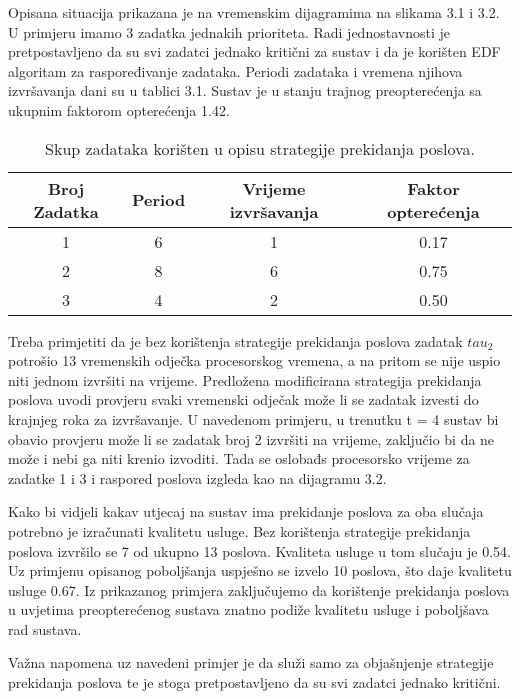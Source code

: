\documentclass[../zavrsni.tex]{subfiles}
\begin{document}
Opisana situacija prikazana je na vremenskim dijagramima na slikama 3.1 i 3.2. U primjeru imamo 3 zadatka jednakih prioriteta. Radi jednostavnosti
je pretpostavljeno da su svi zadatci jednako kritični za sustav i da je korišten EDF algoritam za raspoređivanje zadataka. 
Periodi zadataka i vremena njihova izvršavanja dani su u tablici 3.1. Sustav je u stanju trajnog preopterećenja sa ukupnim
faktorom opterećenja 1.42.

\begin{table}
\begin{center}
  \begin{tabular}{||c || c c c||} 
   \hline
   Broj Zadatka & Period & Vrijeme izvršavanja & Faktor opterećenja \\ [0.5ex] 
   \hline\hline
   1 & 6 & 1 & 0.17 \\ 
   \hline
   2 & 8 & 6 & 0.75 \\
   \hline
   3 & 4 & 2 & 0.50 \\
   \hline
  \end{tabular}
\end{center}
\caption{\label{tab:table-name}Skup zadataka korišten u opisu strategije prekidanja poslova.}
\end{table}

Treba primjetiti da je bez korištenja strategije prekidanja poslova zadatak $tau_2$ potrošio 13 vremenskih odječka procesorskog vremena, a 
na pritom se nije uspio niti jednom izvršiti na vrijeme.
Predložena modificirana strategija prekidanja poslova uvodi provjeru svaki vremenski odječak može li se zadatak izvesti do  krajnjeg roka 
za izvršavanje. 
U navedenom primjeru, u 
trenutku t = 4 sustav bi obavio provjeru može li se zadatak broj 2 izvršiti na vrijeme, zaključio bi da ne može i nebi ga niti krenio 
izvoditi. Tada se oslobađs procesorsko vrijeme za zadatke 1 i 3 i
raspored poslova izgleda kao na dijagramu 3.2. 

Kako bi vidjeli kakav utjecaj na sustav ima prekidanje poslova za oba slučaja potrebno je izračunati kvalitetu usluge.
Bez korištenja strategije prekidanja poslova
izvršilo se 7 od ukupno 13 poslova. Kvaliteta usluge u tom slučaju je 0.54. Uz primjenu opisanog poboljšanja uspješno se izvelo 10 
poslova, što daje kvalitetu usluge 0.67. Iz prikazanog primjera zaključujemo da korištenje prekidanja poslova u uvjetima 
preopterećenog sustava znatno podiže kvalitetu usluge i poboljšava rad sustava.

Važna napomena uz navedeni primjer je da služi samo za objašnjenje strategije prekidanja poslova te je stoga 
pretpostavljeno da su svi zadatci jednako kritični.  
\end{document}
